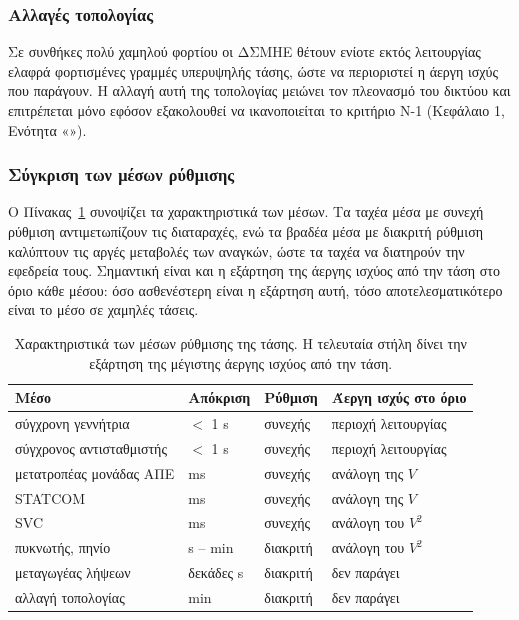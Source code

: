 \subsubsection{Αλλαγές τοπολογίας}

Σε συνθήκες πολύ χαμηλού φορτίου οι ΔΣΜΗΕ θέτουν ενίοτε εκτός λειτουργίας ελαφρά φορτισμένες
γραμμές υπερυψηλής τάσης, ώστε να περιοριστεί η άεργη ισχύς που παράγουν. Η αλλαγή αυτή της
τοπολογίας μειώνει τον πλεονασμό του δικτύου και επιτρέπεται μόνο εφόσον εξακολουθεί να
ικανοποιείται το κριτήριο N-1 (Κεφάλαιο 1, Ενότητα «»).

\subsubsection{Σύγκριση των μέσων ρύθμισης}

Ο Πίνακας~\ref{tab:v-means} συνοψίζει τα χαρακτηριστικά των μέσων. Τα ταχέα μέσα με συνεχή
ρύθμιση αντιμετωπίζουν τις διαταραχές, ενώ τα βραδέα μέσα με διακριτή ρύθμιση καλύπτουν τις
αργές μεταβολές των αναγκών, ώστε τα ταχέα να διατηρούν την εφεδρεία τους. Σημαντική είναι και
η εξάρτηση της άεργης ισχύος από την τάση στο όριο κάθε μέσου: όσο ασθενέστερη είναι η
εξάρτηση αυτή, τόσο αποτελεσματικότερο είναι το μέσο σε χαμηλές τάσεις.

\begin{table}[!htbp]
\centering
\begin{tabular}{llll}
\hline
Μέσο & Απόκριση & Ρύθμιση & Άεργη ισχύς στο όριο \\
\hline
σύγχρονη γεννήτρια & $<$ 1 s & συνεχής & περιοχή λειτουργίας \\
σύγχρονος αντισταθμιστής & $<$ 1 s & συνεχής & περιοχή λειτουργίας \\
μετατροπέας μονάδας ΑΠΕ & ms & συνεχής & ανάλογη της $V$ \\
STATCOM & ms & συνεχής & ανάλογη της $V$ \\
SVC & ms & συνεχής & ανάλογη του $V^2$ \\
πυκνωτής, πηνίο & s -- min & διακριτή & ανάλογη του $V^2$ \\
μεταγωγέας λήψεων & δεκάδες s & διακριτή & δεν παράγει \\
αλλαγή τοπολογίας & min & διακριτή & δεν παράγει \\
\hline
\end{tabular}
\caption{Χαρακτηριστικά των μέσων ρύθμισης της τάσης. Η τελευταία στήλη δίνει την εξάρτηση της
μέγιστης άεργης ισχύος από την τάση.}
\label{tab:v-means}
\end{table}

